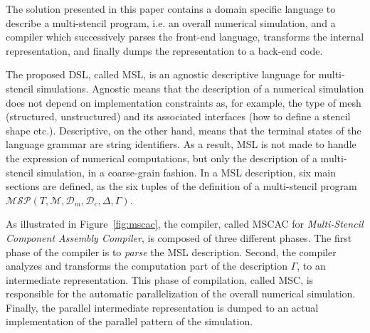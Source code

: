 The solution presented in this paper contains a domain specific language to describe a multi-stencil program, i.e. an overall numerical simulation, and a compiler which successively parses the front-end language, transforms the internal representation, and finally dumps the representation to a back-end code.

The proposed DSL, called MSL, is an agnostic descriptive language for multi-stencil simulations. Agnostic means that the description of a numerical simulation does not depend on implementation constraints as, for example, the type of mesh (structured, unstructured) and its associated interfaces (how to define a stencil shape etc.). Descriptive, on the other hand, means that the terminal states of the language grammar are string identifiers. As a result, MSL is not made to handle the expression of numerical computations, but only the description of a multi-stencil simulation, in a coarse-grain fashion. In a MSL description, six main sections are defined, as the six tuples of the definition of a multi-stencil program $\mathcal{MSP}(T,\mathcal{M},\mathcal{D}_m,\mathcal{D}_c,\Delta,\Gamma)$.

As illustrated in Figure~\ref{fig:mscac}, the compiler, called MSCAC for \emph{Multi-Stencil Component Assembly Compiler}, is composed of three different phases. The first phase of the compiler is to \emph{parse} the MSL description. Second, the compiler analyzes and transforms the computation part of the description $\Gamma$, to an intermediate representation. This phase of compilation, called MSC, is responsible for the automatic parallelization of the overall numerical simulation. Finally, the parallel intermediate representation is dumped to an actual implementation of the parallel pattern of the simulation.

